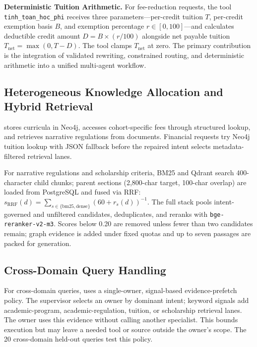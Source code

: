 \textbf{Deterministic Tuition Arithmetic.}
For fee-reduction requests, the tool \texttt{tinh\_}\allowbreak\texttt{toan\_}\allowbreak\texttt{hoc\_}\allowbreak\texttt{phi} receives three parameters---per-credit tuition $T$, per-credit exemption basis $B$, and exemption percentage $r \in [0, 100]$---and calculates deductible credit amount $D = B \times (r / 100)$ alongside net payable tuition $T_{\mathrm{net}} = \max(0, T - D)$. The tool clamps $T_{\mathrm{net}}$ at zero. The primary contribution is the integration of validated rewriting, constrained routing, and deterministic arithmetic into a unified multi-agent workflow.

\subsection{Heterogeneous Knowledge Allocation and Hybrid Retrieval}
\label{sec:hybrid_retrieval}

\system{} stores curricula in Neo4j, accesses cohort-specific fees through structured lookup, and retrieves narrative regulations from documents. Financial requests try Neo4j tuition lookup with JSON fallback before the repaired intent selects metadata-filtered retrieval lanes.

For narrative regulations and scholarship criteria, BM25 and Qdrant search 400-character child chunks; parent sections (2,800-char target, 100-char overlap) are loaded from PostgreSQL and fused via RRF: $s_{\mathrm{RRF}}(d)=\sum_{s\in\{\mathrm{bm25},\mathrm{dense}\}}(60+r_s(d))^{-1}$. The full stack pools intent-governed and unfiltered candidates, deduplicates, and reranks with \texttt{bge-reranker-v2-m3}. Scores below 0.20 are removed unless fewer than two candidates remain; graph evidence is added under fixed quotas and up to seven passages are packed for generation.

\subsection{Cross-Domain Query Handling}
\label{sec:cross_domain}

For cross-domain queries, \system{} uses a single-owner, signal-based evidence-prefetch policy. The supervisor selects an owner by dominant intent; keyword signals add academic-program, academic-regulation, tuition, or scholarship retrieval lanes. The owner uses this evidence without calling another specialist. This bounds execution but may leave a needed tool or source outside the owner's scope. The 20 cross-domain held-out queries test this policy.
